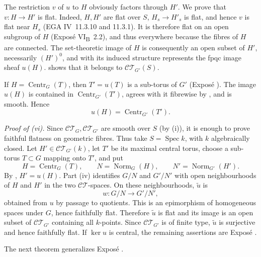 The restriction \(v\) of \(u\) to \(H\) obviously factors through \(H'\).
We prove that \(v:H\to H'\) is flat. Indeed, \(H,H'\) are
flat over \(S\), \(H_s\to H'_s\) is flat, and hence \(v\) is flat
near \(H_s\) (EGA IV~11.3.10 and 11.3.1). It is therefore flat on an
open subgroup of \(H\) (Exposé VI\textsubscript{B}~2.2), and thus
everywhere because the fibres of \(H\) are connected. The
set-theoretic image of \(H\) is consequently an open subset of \(H'\),
necessarily \((H')^0\), and with its induced structure represents
the fpqc image sheaf \(u(H)\).  shows that it belongs to
\(\mathcal{CT}_{G'}(S)\).

If \(H=\operatorname{Centr}_G(T)\), then \(T'=u(T)\) is a sub-torus
of \(G'\) (Exposé ). The image \(u(H)\) is contained in
\(\operatorname{Centr}_{G'}(T')\), agrees with it fibrewise by
, and is smooth. Hence
\[
  u(H)=\operatorname{Centr}_{G'}(T').
\]

\medskip\noindent\textit{Proof of (vi).}
Since \(\mathcal{CT}_G,\mathcal{CT}_{G'}\) are smooth over \(S\) (by (i)), it
is enough to prove faithful flatness on geometric fibres. Thus take
\(S=\operatorname{Spec}k\), with \(k\) algebraically closed. Let
\(H'\in\mathcal{CT}_{G'}(k)\), let \(T'\) be its maximal central
torus, choose a sub-torus \(T\subset G\) mapping onto \(T'\), and put
\[
 H=\operatorname{Centr}_G(T),\qquad
 N=\operatorname{Norm}_G(H),\qquad
 N'=\operatorname{Norm}_{G'}(H').
\]
By , \(H'=u(H)\). Part (iv) identifies \(G/N\) and \(G'/N'\)
with open neighbourhoods of \(H\) and \(H'\) in the two
\(\mathcal{CT}\)-spaces. On these neighbourhoods, \(\widetilde u\)
is
\[
  w:G/N\longrightarrow G'/N',
\]
obtained from \(u\) by passage to quotients. This is an epimorphism
of homogeneous spaces under \(G\), hence faithfully flat. Therefore
\(\widetilde u\) is flat and its image is an open subset of
\(\mathcal{CT}_{G'}\) containing all \(k\)-points. Since
\(\mathcal{CT}_{G'}\) is of finite type, \(\widetilde u\) is
surjective and hence faithfully flat. If \(\ker u\) is central, the
remaining assertions are Exposé .

The next theorem generalizes Exposé .

